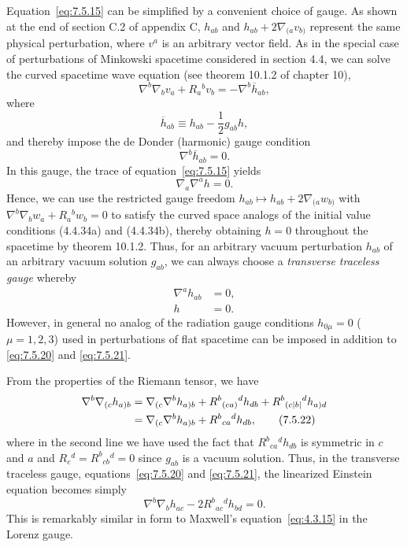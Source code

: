 Equation~\eqref{eq:7.5.15} can be simplified by a convenient choice of gauge. As
shown at the end of section C.2 of appendix C, \(h_{ab}\) and
\(h_{ab}+2\nabla_{(a}v_{b)}\) represent the same physical perturbation, where
\(v^a\) is an arbitrary vector field. As in the special case of perturbations of
Minkowski spacetime considered in section 4.4, we can solve the curved spacetime
wave equation (see theorem 10.1.2 of chapter 10),
\begin{equation}
  \nabla^b\nabla_bv_a+R_a{}^bv_b=-\nabla^b\overline h_{ab} ,
  \tag{7.5.16}\label{eq:7.5.16}
\end{equation}
where
\begin{equation}
  \overline h_{ab}\equiv h_{ab}-\frac12g_{ab}h ,
  \tag{7.5.17}\label{eq:7.5.17}
\end{equation}
and thereby impose the de Donder (harmonic) gauge condition
\begin{equation}
  \nabla^b\overline h_{ab}=0 .
  \tag{7.5.18}\label{eq:7.5.18}
\end{equation}
In this gauge, the trace of equation~\eqref{eq:7.5.15} yields
\begin{equation}
  \nabla_a\nabla^ah=0 .
  \tag{7.5.19}\label{eq:7.5.19}
\end{equation}
Hence, we can use the restricted gauge freedom
\(h_{ab}\longmapsto h_{ab}+2\nabla_{(a}w_{b)}\) with
\(\nabla^b\nabla_bw_a+R_a{}^bw_b=0\) to satisfy the curved space analogs of the
initial value conditions (4.4.34a) and (4.4.34b), thereby obtaining \(h=0\)
throughout the spacetime by theorem 10.1.2. Thus, for an arbitrary vacuum
perturbation \(h_{ab}\) of an arbitrary vacuum solution \(g_{ab}\), we can always
choose a \emph{transverse traceless gauge} whereby
\begin{align}
  \nabla^ah_{ab}&=0 ,
  \tag{7.5.20}\label{eq:7.5.20}\\
  h&=0 .
  \tag{7.5.21}\label{eq:7.5.21}
\end{align}
However, in general no analog of the radiation gauge conditions
\(h_{0\mu}=0\) (\(\mu=1,2,3\)) used in perturbations of flat spacetime can be
imposed in addition to \eqref{eq:7.5.20} and \eqref{eq:7.5.21}.

From the properties of the Riemann tensor, we have
\begin{align}
  \nabla^b\nabla_{(c}h_{a)b}
    &=\nabla_{(c}\nabla^bh_{a)b}
      +R^b{}_{(ca)}{}^dh_{db}
      +R^b{}_{(c|b|}{}^dh_{a)d} \notag\\
    &=\nabla_{(c}\nabla^bh_{a)b}
      +R^b{}_{ca}{}^dh_{db} ,
  \tag{7.5.22}\label{eq:7.5.22}
\end{align}
where in the second line we have used the fact that
\(R^b{}_{ca}{}^dh_{db}\) is symmetric in \(c\) and \(a\) and
\(R_c{}^d=R^b{}_{cb}{}^d=0\) since \(g_{ab}\) is a vacuum solution. Thus, in
the transverse traceless gauge, equations~\eqref{eq:7.5.20} and
\eqref{eq:7.5.21}, the linearized Einstein equation becomes simply
\begin{equation}
  \nabla^b\nabla_bh_{ac}-2R^b{}_{ac}{}^dh_{bd}=0 .
  \tag{7.5.23}\label{eq:7.5.23}
\end{equation}
This is remarkably similar in form to Maxwell's equation~\eqref{eq:4.3.15} in the
Lorenz gauge.

